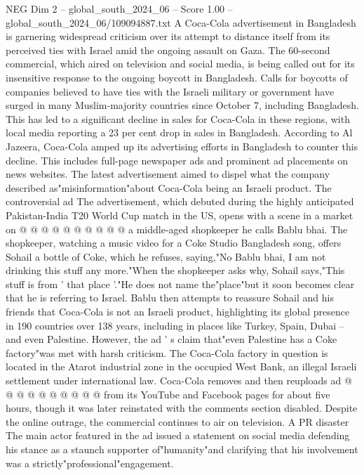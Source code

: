 \begin{textsample}{NEG Dim 2 – global\_south\_2024\_06 – Score 1.00 – global\_south\_2024\_06/109094887.txt}  \label{ex:f2_neg_396}
A Coca-Cola advertisement in Bangladesh is garnering widespread criticism over its attempt to distance itself from its perceived ties with Israel amid the ongoing assault on Gaza.
The 60-second commercial, which aired on television and social media, is being called out for its insensitive response to the ongoing boycott in Bangladesh.
Calls for boycotts of companies believed to have ties with the Israeli military or government have surged in many Muslim-majority countries since October 7, including Bangladesh.
This has led to a significant decline in sales for Coca-Cola in these regions, with local media reporting a 23 per cent drop in sales in Bangladesh.
According to Al Jazeera, Coca-Cola amped up its advertising efforts in Bangladesh to counter this decline.
This includes full-page newspaper ads and prominent ad placements on news websites.
The latest advertisement aimed to dispel what the company described as"misinformation"about Coca-Cola being an Israeli product.
The controversial ad The advertisement, which debuted during the highly anticipated Pakistan-India T20 World Cup match in the US, opens with a scene in a market on @ @ @ @ @ @ @ @ @ @ a middle-aged shopkeeper he calls Bablu bhai.
The shopkeeper, watching a music video for a Coke Studio Bangladesh song, offers Sohail a bottle of Coke, which he refuses, saying,"No Bablu bhai, I am not drinking this stuff any more."When the shopkeeper asks why, Sohail says,"This stuff is from ' that place '."He does not name the"place"but it soon becomes clear that he is referring to Israel.
Bablu then attempts to reassure Sohail and his friends that Coca-Cola is not an Israeli product, highlighting its global presence in 190 countries over 138 years, including in places like Turkey, Spain, Dubai -- and even Palestine.
However, the ad ' s claim that"even Palestine has a Coke factory"was met with harsh criticism.
The Coca-Cola factory in question is located in the Atarot industrial zone in the occupied West Bank, an illegal Israeli settlement under international law.
Coca-Cola removes and then reuploads ad @ @ @ @ @ @ @ @ @ @ from its YouTube and Facebook pages for about five hours, though it was later reinstated with the comments section disabled.
Despite the online outrage, the commercial continues to air on television.
A PR disaster The main actor featured in the ad issued a statement on social media defending his stance as a staunch supporter of"humanity"and clarifying that his involvement was a strictly"professional"engagement.

\end{textsample}
